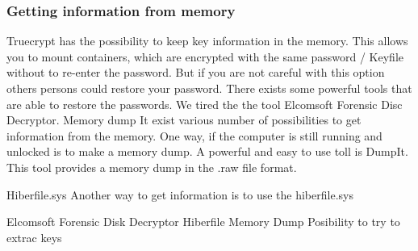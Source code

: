 \subsubsection{Getting information from memory}
Truecrypt has the possibility to keep key information in the memory. This allows you to mount containers, which are encrypted with the same password / Keyfile without to re-enter the password. But if you are not careful with this option others persons could restore your password. There exists some powerful tools that are able to restore the passwords. We tired the the tool Elcomsoft Forensic Disc Decryptor.
\cite{elcomsoft:forensicDiskDecrypt}
Memory dump
It exist various number of possibilities to get information from the memory. One way, if the computer is still running and unlocked is to make a memory dump. A powerful and easy to use toll is DumpIt. This tool provides a memory dump in the .raw file format.

Hiberfile.sys
Another way to get information is to use the hiberfile.sys

Elcomsoft Forensic Disk Decryptor
Hiberfile
Memory Dump 
Posibility to try to extrac keys 



